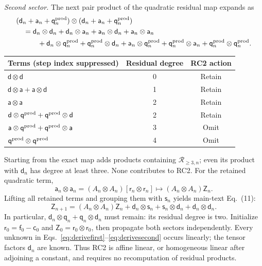 \documentclass[10pt,letterpaper]{article}
\newcommand{\fld}[1]{\mathsf{#1}}
\begin{document}
\textit{Second sector.} The next pair product of the quadratic residual map expands as
\begin{align}
 &(\fld d_n+\fld a_n+\fld q_n^{\rm prod})\otimes(\fld d_n+\fld a_n+\fld q_n^{\rm prod})\notag\\
 &\quad=\fld d_n\otimes\fld d_n
 +\fld d_n\otimes\fld a_n+\fld a_n\otimes\fld d_n
 +\fld a_n\otimes\fld a_n\notag\\
 &\qquad\quad+\fld d_n\otimes\fld q_n^{\rm prod}+\fld q_n^{\rm prod}\otimes\fld d_n
 +\fld a_n\otimes\fld q_n^{\rm prod}+\fld q_n^{\rm prod}\otimes\fld a_n
 +\fld q_n^{\rm prod}\otimes\fld q_n^{\rm prod}.
\end{align}
\begin{center}
\begin{tabular}{lcc}\toprule
Terms (step index suppressed) & Residual degree & RC2 action\\\midrule
$\fld d\otimes\fld d$ & 0 & Retain\\
$\fld d\otimes\fld a+\fld a\otimes\fld d$ & 1 & Retain\\
$\fld a\otimes\fld a$ & 2 & Retain\\
$\fld d\otimes\fld q^{\rm prod}+\fld q^{\rm prod}\otimes\fld d$ & 2 & Retain\\
$\fld a\otimes\fld q^{\rm prod}+\fld q^{\rm prod}\otimes\fld a$ & 3 & Omit\\
$\fld q^{\rm prod}\otimes\fld q^{\rm prod}$ & 4 & Omit\\\bottomrule
\end{tabular}
\end{center}
Starting from the exact map adds products containing $\mathcal R_{\geq3,n}$; even its product with $\fld d_n$ has degree at least three. None contributes to RC2. For the retained quadratic term,
\begin{equation}
 \fld a_n\otimes\fld a_n=(A_n\otimes A_n)[\fld r_n\otimes\fld r_n]
 \longmapsto(A_n\otimes A_n)\fld Z_n.
\end{equation}
Lifting all retained terms and grouping them with $\fld s_n$ yields main-text Eq.~(11):
\begin{equation}
 \fld Z_{n+1}=(A_n\otimes A_n)\fld Z_n
 +\fld d_n\otimes\fld s_n+\fld s_n\otimes\fld d_n+\fld d_n\otimes\fld d_n.
 \label{eq:derivesecond}
\end{equation}
In particular, $\fld d_n\otimes\fld q_n+\fld q_n\otimes\fld d_n$ must remain: its residual degree is two. Initialize $\fld r_0=\fld f_0-\fld c_0$ and $\fld Z_0=\fld r_0\otimes\fld r_0$, then propagate both sectors independently. Every unknown in Eqs.~\eqref{eq:derivefirst}--\eqref{eq:derivesecond} occurs linearly; the tensor factors $\fld d_n$ are known. Thus RC2 is affine linear, or homogeneous linear after adjoining a constant, and requires no recomputation of residual products.
\end{document}
